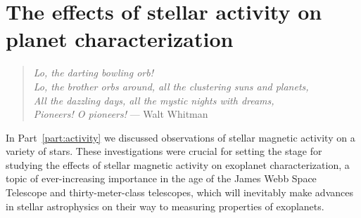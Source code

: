 \documentclass[12pt, twoside]{uwthesis}
\begin{document}
%
%
%
%
%
%
%
%
%
%
%
%

\part{The effects of stellar activity on planet characterization} \label{part:synthesis}

\begin{verse}
{\it Lo, the darting bowling orb!\\
Lo, the brother orbs around, all the clustering suns and planets,\\
All the dazzling days, all the mystic nights with dreams,\\
Pioneers! O pioneers!}
\hfill --- Walt Whitman
\end{verse}

In Part~\ref{part:activity} we discussed observations of stellar magnetic activity on a variety of stars. %
These investigations were crucial for setting the stage for studying the effects of stellar magnetic activity on exoplanet characterization, a topic of ever-increasing importance in the age of the James Webb Space Telescope and thirty-meter-class telescopes, which will inevitably make advances in stellar astrophysics on their way to measuring properties of exoplanets.  
\end{document}
